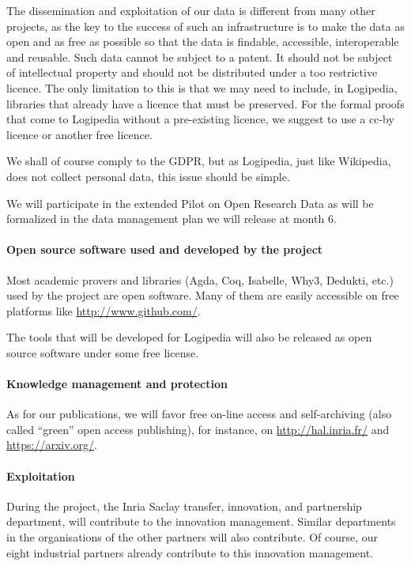 The dissemination and exploitation of our data is different from many
other projects, as the key to the success of such an infrastructure is
to make the data as open and as free as possible so that the data is
findable, accessible, interoperable and reusable. Such data cannot be
subject to a patent. It should not be subject of intellectual property
and should not be distributed under a too restrictive licence. The only
limitation to this is that we may need to include, in Logipedia,
libraries that already have a licence that must be preserved.  For the
formal proofs that come to Logipedia without a pre-existing licence,
we suggest to use a cc-by licence or another free licence.

We shall of course comply to the GDPR, but as Logipedia, just like 
Wikipedia, does not collect personal data, this issue should be simple.

We will participate in the extended Pilot on Open Research Data as
will be formalized in the data management plan we will release at
month 6.

\paragraph*{Open source software used and developed by the project}

Most academic provers and libraries (Agda, Coq, Isabelle, Why3,
Dedukti, etc.) used by the project are open software. Many of them are
easily accessible on free platforms like \url{http://www.github.com/}.

The tools that will be developed for Logipedia will also be released
as open source software under some free license.

\paragraph*{Knowledge management and protection}

As for our publications, we will favor free on-line access and
self-archiving (also called ``green'' open access publishing), for
instance, on \url{http://hal.inria.fr/} and \url{https://arxiv.org/}.

\paragraph*{Exploitation}

During the project, the Inria Saclay transfer, innovation, and
partnership department, will contribute to the innovation management.
Similar departments in the organisations  of the other partners will 
also contribute. Of course, our eight industrial partners already 
contribute to this innovation management.

